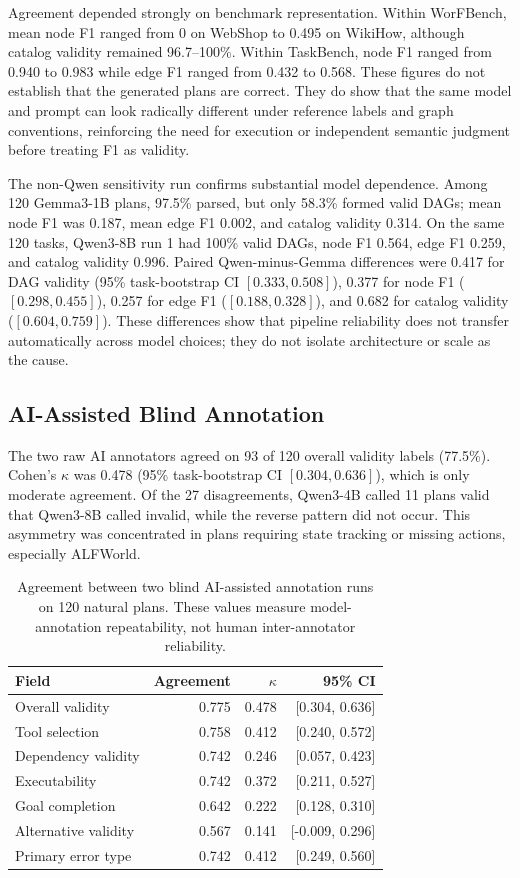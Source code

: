 \documentclass[10pt]{article}
\begin{document}
Agreement depended strongly on benchmark representation. Within WorFBench,
mean node F1 ranged from 0 on WebShop to 0.495 on WikiHow, although catalog
validity remained 96.7--100\%. Within TaskBench, node F1 ranged from 0.940 to
0.983 while edge F1 ranged from 0.432 to 0.568. These figures do not establish
that the generated plans are correct. They do show that the same model and
prompt can look radically different under reference labels and graph
conventions, reinforcing the need for execution or independent semantic
judgment before treating F1 as validity.

The non-Qwen sensitivity run confirms substantial model dependence. Among 120
Gemma3-1B plans, 97.5\% parsed, but only 58.3\% formed valid DAGs; mean node F1
was 0.187, mean edge F1 0.002, and catalog validity 0.314. On the same 120 tasks,
Qwen3-8B run 1 had 100\% valid DAGs, node F1 0.564, edge F1 0.259, and catalog
validity 0.996. Paired Qwen-minus-Gemma differences were 0.417 for DAG validity
(95\% task-bootstrap CI $[0.333,0.508]$), 0.377 for node F1
($[0.298,0.455]$), 0.257 for edge F1 ($[0.188,0.328]$), and 0.682 for catalog
validity ($[0.604,0.759]$). These differences show that pipeline reliability
does not transfer automatically across model choices; they do not isolate
architecture or scale as the cause.

\subsection{AI-Assisted Blind Annotation}
The two raw AI annotators agreed on 93 of 120 overall validity labels (77.5\%).
Cohen's $\kappa$ was 0.478 (95\% task-bootstrap CI $[0.304,0.636]$), which is
only moderate agreement. Of the 27 disagreements, Qwen3-4B called 11 plans
valid that Qwen3-8B called invalid, while the reverse pattern did not occur.
This asymmetry was concentrated in plans requiring state tracking or missing
actions, especially ALFWorld.

\begin{table}[t]
\centering
\caption{Agreement between two blind AI-assisted annotation runs on 120
natural plans. These values measure model-annotation repeatability, not human
inter-annotator reliability.}
\label{tab:aiagreement}
\begin{tabular}{lrrr}
\toprule
Field & Agreement & $\kappa$ & 95\% CI \\
\midrule
Overall validity & 0.775 & 0.478 & [0.304, 0.636] \\
Tool selection & 0.758 & 0.412 & [0.240, 0.572] \\
Dependency validity & 0.742 & 0.246 & [0.057, 0.423] \\
Executability & 0.742 & 0.372 & [0.211, 0.527] \\
Goal completion & 0.642 & 0.222 & [0.128, 0.310] \\
Alternative validity & 0.567 & 0.141 & [-0.009, 0.296] \\
Primary error type & 0.742 & 0.412 & [0.249, 0.560] \\
\bottomrule
\end{tabular}
\end{table}
\end{document}
